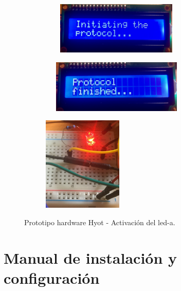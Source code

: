 \documentclass[12pt,a4paper, twoside]{report}
\begin{document}
	\begin{figure}[!ht]		
		\caption{Prototipo hardware Hyot - Inicio y finalización del protocolo de alerta.}
 		\begin{subfigure}{0.5\textwidth}
 			\hbox{
 				\hspace{0cm}
 				\includegraphics[width=7cm, height=2.5cm]{Images/hardware/lcd_protocol} 
 			}
		\end{subfigure}
		\begin{subfigure}{0.5\textwidth}
			\hbox{
 				\hspace{1cm}
				\includegraphics[width=7cm, height=2.5cm]{Images/hardware/lcd_protocol_finished}
			}
		\end{subfigure}
		\label{fig:hardware_protocol}
	\end{figure}
		
	\begin{figure}[!ht]   
		\caption{Prototipo hardware Hyot - Activación del \gls{led-a}.} 
		\begin{center} 
	 		\includegraphics[width=6cm,height=4.5cm]{Images/hardware/led_alert} \\
			\label{fig:hardware_led} 
		\end{center}  
	\end{figure}  
	
	\chapter{Manual de instalación y configuración}\label{install}
	
\end{document}
